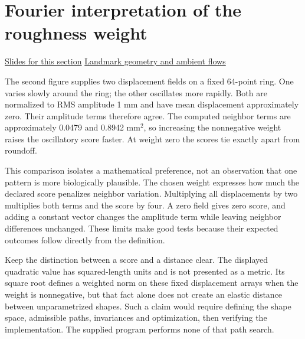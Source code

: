 \documentclass[11pt,letterpaper]{article}
\theoremstyle{definition}\newtheorem{definition}{Definition}\newtheorem{example}{Example}
\numberwithin{equation}{section}
\begin{document}
\section{Fourier interpretation of the roughness weight}
\hypertarget{note-fourier-interpretation-of-the-roughness-weight}{}\label{note:fourier-interpretation-of-the-roughness-weight}
{\small \href{slides.html\#frame=scaling-and-constant-shifts\&step=1}{Slides for this section} \quad \href{../modules/shape-lab/index.html}{Landmark geometry and ambient flows}}\par
The second figure supplies two displacement fields on a fixed 64-point ring. One varies slowly around the ring; the other oscillates more rapidly. Both are normalized to RMS amplitude 1 mm and have mean displacement approximately zero. Their amplitude terms therefore agree. The computed neighbor terms are approximately 0.0479 and 0.8942 mm\ensuremath{^{2}}, so increasing the nonnegative weight raises the oscillatory score faster. At weight zero the scores tie exactly apart from roundoff.

This comparison isolates a mathematical preference, not an observation that one pattern is more biologically plausible. The chosen weight expresses how much the declared score penalizes neighbor variation. Multiplying all displacements by two multiplies both terms and the score by four. A zero field gives zero score, and adding a constant vector changes the amplitude term while leaving neighbor differences unchanged. These limits make good tests because their expected outcomes follow directly from the definition.

Keep the distinction between a score and a distance clear. The displayed quadratic value has squared-length units and is not presented as a metric. Its square root defines a weighted norm on these fixed displacement arrays when the weight is nonnegative, but that fact alone does not create an elastic distance between unparametrized shapes. Such a claim would require defining the shape space, admissible paths, invariances and optimization, then verifying the implementation. The supplied program performs none of that path search.
\end{document}
